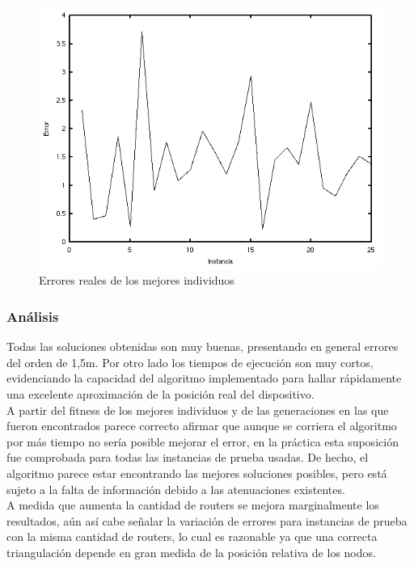 \documentclass[journal]{IEEEtran}
\begin{document}
\begin{figure}[h]
\centering
\includegraphics[width=\linewidth]{errors.png}
\caption{Errores reales de los mejores individuos}
\label{fig:errors}
\end{figure}

\subsubsection*{Análisis}

Todas las soluciones obtenidas son muy buenas, presentando en general errores del orden de 1,5m. Por otro lado los tiempos de ejecución son muy cortos, evidenciando la capacidad del algoritmo implementado para hallar rápidamente una excelente aproximación de la posición real del dispositivo.\\

A partir del fitness de los mejores individuos y de las generaciones en las que fueron encontrados parece correcto afirmar que aunque se corriera el algoritmo por más tiempo no sería posible mejorar el error, en la práctica esta suposición fue comprobada para todas las instancias de prueba usadas. De hecho, el algoritmo parece estar encontrando las mejores soluciones posibles, pero está sujeto a la falta de información debido a las atenuaciones existentes.\\

A medida que aumenta la cantidad de routers se mejora marginalmente los resultados, aún así cabe señalar la variación de errores para instancias de prueba con la misma cantidad de routers, lo cual es razonable ya que una correcta triangulación depende en gran medida de la posición relativa de los nodos.\\
\end{document}
